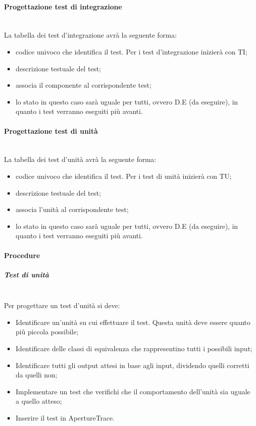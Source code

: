 \paragraph{Progettazione test di integrazione} \hfill \\
La tabella dei test d'integrazione avrà la seguente forma:
\begin{itemize}
\item {}codice univoco che identifica il test. Per i test d'integrazione inizierà con TI;
\item {} descrizione testuale del test;
\item {} associa il componente al corrispondente test;
\item {}lo stato in questo caso sarà uguale per tutti, ovvero D.E (da eseguire), in quanto i test verranno eseguiti più avanti.
\end{itemize}

\paragraph{Progettazione test di unità} \hfill \\
La tabella dei test d'unità avrà la seguente forma:
\begin{itemize}
\item {}codice univoco che identifica il test. Per i test di unità inizierà con TU;
\item {} descrizione testuale del test;
\item {} associa l'unità al corrispondente test;
\item {}lo stato in questo caso sarà uguale per tutti, ovvero D.E (da eseguire), in quanto i test verranno eseguiti più avanti.
\end{itemize}

\paragraph{Procedure}

\subparagraph{Test di unità} \hfill \\
Per progettare un test d'unità si deve:
\begin{itemize}
\item Identificare un'unità su cui effettuare il test. Questa unità deve essere quanto più piccola possibile;
\item Identificare delle classi di equivalenza che rappresentino tutti i possibili input;
\item Identificare tutti gli output attesi in base agli input, dividendo quelli corretti da quelli non;
\item Implementare un test che verifichi che il comportamento dell'unità sia uguale a quello atteso;
\item Inserire il test in ApertureTrace.
\end{itemize}

